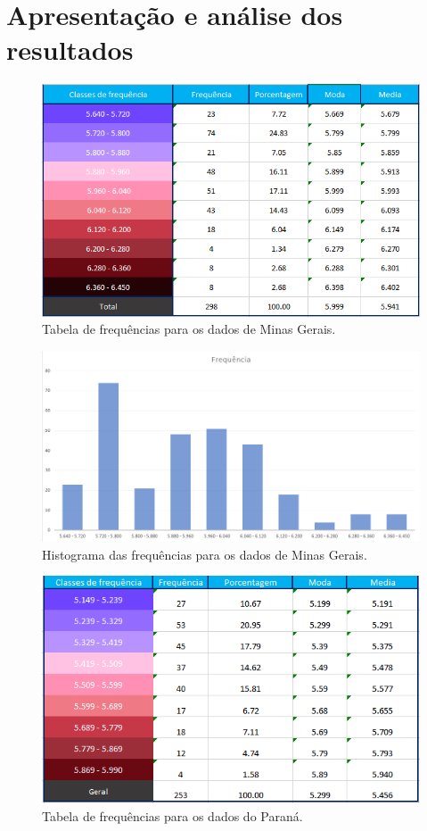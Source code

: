 \documentclass[12pt]{article}
\begin{document}
\section{Apresentação e análise dos resultados}

\begin{figure}[H]
    \includegraphics[width=\linewidth]{frequencias_mg.png}
    \caption{Tabela de frequências para os dados de Minas Gerais.}
\end{figure}

\begin{figure}[H]
    \includegraphics[width=\linewidth]{histograma_mg.png}
    \caption{Histograma das frequências para os dados de Minas Gerais.}
\end{figure}

\begin{figure}[H]
    \includegraphics[width=\linewidth]{frequencias_pr.png}
    \caption{Tabela de frequências para os dados do Paraná.}
\end{figure}
\end{document}
